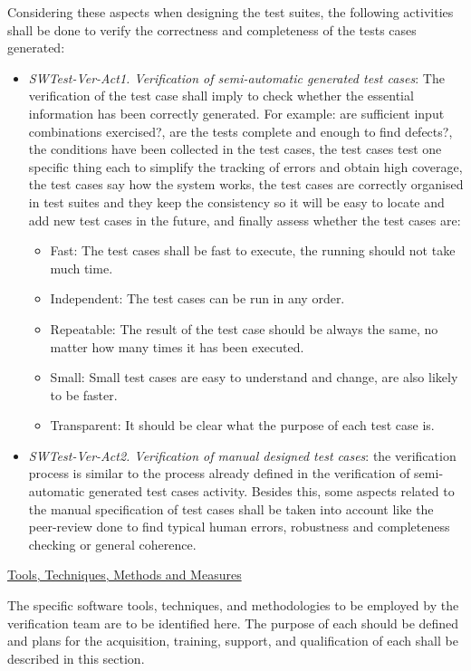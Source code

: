 Considering these aspects when designing the test suites, the
following activities shall be done to verify the correctness and
completeness of the tests cases generated:

\begin{itemize}
\item {\it SWTest-Ver-Act1. Verification of semi-automatic generated
    test cases}: The verification of the test case shall imply to
  check whether the essential information has been correctly
  generated. For example: are sufficient input combinations
  exercised?, are the tests complete and enough to find defects?, the
  conditions have been collected in the test cases, the test cases
  test one specific thing each to simplify the tracking of errors and
  obtain high coverage, the test cases say how the system works, the
  test cases are correctly organised in test suites and they keep the
  consistency so it will be easy to locate and add new test cases in
  the future, and finally assess whether the test cases are:
\begin{itemize}
\item Fast: The test cases shall be fast to execute, the running
  should not take much time.
\item Independent: The test cases can be run in any order. 
\item Repeatable: The result of the test case should be always the
  same, no matter how many times it has been executed.
\item Small: Small test cases are easy to understand and change, are
  also likely to be faster.
\item Transparent: It should be clear what the purpose of each test case is.
\end{itemize} 
\item {\it SWTest-Ver-Act2. Verification of manual designed test
    cases}: the verification process is similar to the process already
  defined in the verification of semi-automatic generated test cases
  activity. Besides this, some aspects related to the manual
  specification of test cases shall be taken into account like the
  peer-review done to find typical human errors, robustness and
  completeness checking or general coherence.
\end{itemize}


\underline{Tools, Techniques, Methods and Measures} 

The specific software tools, techniques, and methodologies to be
employed by the verification team are to be identified here. 
The purpose of each should be defined and plans for the acquisition,
training, support, and qualification of each shall be described in
this section. 

